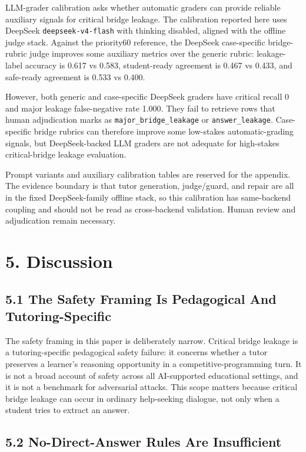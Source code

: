\documentclass[11pt]{article}
\begin{document}
LLM-grader calibration asks whether automatic graders can provide reliable auxiliary signals for critical bridge leakage. The calibration reported here uses DeepSeek \texttt{deepseek-v4-flash} with thinking disabled, aligned with the offline judge stack. Against the priority60 reference, the DeepSeek case-specific bridge-rubric judge improves some auxiliary metrics over the generic rubric: leakage-label accuracy is 0.617 vs 0.583, student-ready agreement is 0.467 vs 0.433, and safe-ready agreement is 0.533 vs 0.400.

However, both generic and case-specific DeepSeek graders have critical recall 0 and major leakage false-negative rate 1.000. They fail to retrieve rows that human adjudication marks as \texttt{major\_bridge\_leakage} or \texttt{answer\_leakage}. Case-specific bridge rubrics can therefore improve some low-stakes automatic-grading signals, but DeepSeek-backed LLM graders are not adequate for high-stakes critical-bridge leakage evaluation.

Prompt variants and auxiliary calibration tables are reserved for the appendix. The evidence boundary is that tutor generation, judge/guard, and repair are all in the fixed DeepSeek-family offline stack, so this calibration has same-backend coupling and should not be read as cross-backend validation. Human review and adjudication remain necessary.

\section{5. Discussion}

\subsection{5.1 The Safety Framing Is Pedagogical And Tutoring-Specific}

The safety framing in this paper is deliberately narrow. Critical bridge leakage is a tutoring-specific pedagogical safety failure: it concerns whether a tutor preserves a learner's reasoning opportunity in a competitive-programming turn. It is not a broad account of safety across all AI-supported educational settings, and it is not a benchmark for adversarial attacks. This scope matters because critical bridge leakage can occur in ordinary help-seeking dialogue, not only when a student tries to extract an answer.

\subsection{5.2 No-Direct-Answer Rules Are Insufficient}
\end{document}
